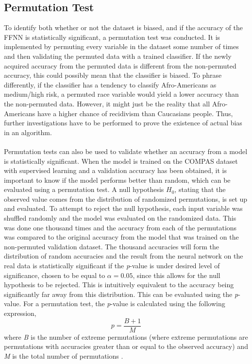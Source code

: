 \documentclass[11pt, fleqn, titlepage]{article}
\begin{document}
	\subsection{Permutation Test}\label{permutation_test}
	To identify both whether or not the dataset is biased, and if the accuracy of the FFNN is statistically significant, a permutation test was conducted. It is implemented by permuting every variable in the dataset some number of times and then validating the permuted data with a trained classifier. If the newly acquired accuracy from the permuted data is different from the non-permuted accuracy, this could possibly mean that the classifier is biased. To phrase differently, if the classifier has a tendency to classify Afro-Americans as medium/high risk, a permuted race variable would yield a lower accuracy than the non-permuted data. However, it might just be the reality that all Afro-Americans have a higher chance of recidivism than Caucasians people. Thus, further investigations have to be performed to prove the existence of actual bias in an algorithm. \\\\
	Permutation tests can also be used to validate whether an accuracy from a model is statistically significant. When the model is trained on the COMPAS dataset with supervised learning and a validation accuracy has been obtained, it is important to know if the model performs better than random, which can be evaluated using a permutation test. A null hypothesis $H_{0}$, stating that the observed value comes from the distribution of randomized permutations, is set up and evaluated. To attempt to reject the null hypothesis, each input variable was shuffled randomly and the model was evaluated on the randomized data. This was done one thousand times and the accuracy from each of the permutations was compared to the original accuracy from the model that was trained on the non-permuted validation dataset. The thousand accuracies will form the distribution of random accuracies and the result from the neural network on the real data is statistically significant if the \textit{p}-value is under desired level of significance, chosen to be equal to $ \alpha = 0.05 $, since this allows for the null hypothesis to be rejected. This is intuitively equivalent to the accuracy being significantly far away from this distribution. 
	 This can be evaluated using the \textit{p}-value. For a permutation test, the \textit{p}-value is calculated using the following expression,
	\begin{equation}\label{pval}
	p=\frac{B+1}{M}
	\end{equation}
	where \textit{B} is the number of extreme permutations (where extreme permutations are permutations with accuracies greater than or equal to the observed accuracy) and \textit{M} is the total number of permutations \cite{p-value}.
	
\end{document}
